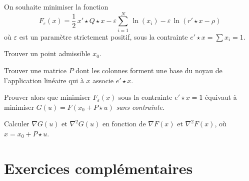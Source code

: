 \documentclass[12pt,a4paper,fleqn]{report}
\newcommand{\grad}{\nabla}
\newcommand{\hess}{\nabla^2}
\newcommand{\on}{\begin{displaymath}}
\newcommand{\off}{\end{displaymath}}
\begin{document}
\begin{exercice}
On souhaite minimiser la fonction
\on F_{\varepsilon}(x)=\frac{1}{2}\,x'\star Q\star x -\varepsilon\sum_{i=1}^N\,\ln (x_i) -\varepsilon\,\ln (r'\star x-\rho) \off
o\`u $\varepsilon$ est un param\`etre strictement positif, sous la contrainte $e'\star x=\sum x_i=1$.
\begin{questions}
\item Trouver un point admissible $x_0$.
\item Trouver une matrice $P$ dont les colonnes forment une base du noyau de l'application lin\'eaire qui \`a $x$ associe $e'\star x$.
\item Prouver alors que minimiser $F_{\varepsilon}(x)$ sous la contrainte $e'\star x=1$ \'equivaut \`a minimiser $G(u)=F(x_0+P\star u)$ \it sans \rm contrainte.
\item Calculer $\grad G(u)$ et $\hess G(u)$ en fonction de $\grad F(x)$ et $\hess F(x)$, o\`u $x=x_0 + P \star u$.
\end{questions}
\end{exercice}

\section{Exercices compl\'ementaires}
\end{document}
